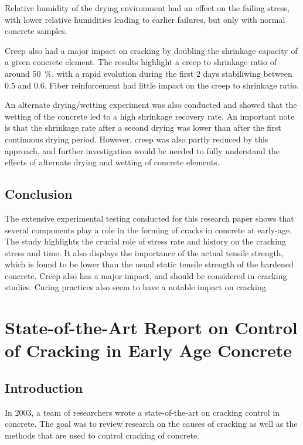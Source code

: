 \documentclass{memoir}
\begin{document}
Relative humidity of the drying environment had an effect on the failing
stress, with lower relative humidities leading to earlier failures, but only
with normal concrete samples.

Creep also had a major impact on cracking by doubling the shrinkage capacity of
a given concrete element. The results highlight a creep to shrinkage ratio of
around \SI{50}{\percent}, with a rapid evolution during the first 2 days
stabiliwing between \num{0.5} and \num{.6}. Fiber reinforcement had little
impact on the creep to shrinkage ratio.

An alternate drying/wetting experiment was also conducted and showed that the
wetting of the concrete led to a high shrinkage recovery rate. An important
note is that the shrinkage rate after a second drying was lower than after the
first continuous drying period. However, creep was also partly reduced by this
approach, and further investigation would be needed to fully understand the
effects of alternate drying and wetting of concrete elements.

\subsection{Conclusion}
The extensive experimental testing conducted for this research paper shows that
several components play a role in the forming of cracks in concrete at
early-age. The study highlights the crucial role of stress rate and history on
the cracking stress and time. It also displays the importance of the actual
tensile strength, which is found to be lower than the usual static tensile
strength of the hardened concrete. Creep also has a major impact, and should be
considered in cracking studies. Curing practices also seem to have a notable
impact on cracking.

\section[State-of-the-Art Report on Control of Cracking in Early Age Concrete]
{State-of-the-Art Report on Control of Cracking in Early Age Concrete \cite{soa}}

\subsection{Introduction}
In 2003, a team of researchers wrote a state-of-the-art on cracking control in
concrete. The goal was to review research on the causes of cracking as well as
the methods that are used to control cracking of concrete.
\end{document}
